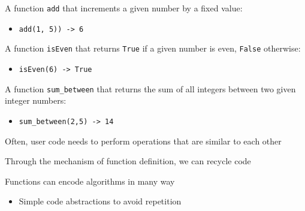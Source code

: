 \documentclass{beamer}
\begin{document}
\begin{comment}
	\begin{lstlisting}
def distance(n,m):
  if n >= m:
    return 0
  else:
    return sum_between(n + 1, m) + 1
	
print(distance(2, 4)))
	\end{lstlisting}
	
	\pause
	
	\begin{statetable}
		{|c|c|}{PC & distance }{7 & \red{2} }
	\end{statetable} \ \\
\end{frame}

\end{comment}

\begin{slide}{
\item A function \texttt{add} that increments a given number by a fixed value:
\begin{itemize}
\item \texttt{add(1, 5)) -> 6}
\end{itemize}
\item A function \texttt{isEven} that returns \texttt{True} if a given number is even, \texttt{False} otherwise:
\begin{itemize}
\item \texttt{isEven(6) -> True}
\end{itemize}
\item A function \texttt{sum\_between} that returns the sum of all integers between two given integer numbers:
\begin{itemize}
\item \texttt{sum\_between(2,5) -> 14}
\end{itemize}
}\end{slide}

\begin{slide}{
\item Often, user code needs to perform operations that are similar to each other
\item Through the mechanism of function definition, we can recycle code
\item Functions can encode algorithms in many way
\begin{itemize}
\item Simple code abstractions to avoid repetition
\end{itemize}
}\end{slide}

\begin{thankyou}
\end{thankyou}
\end{document}
